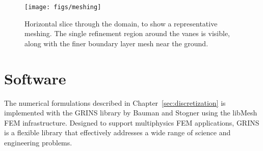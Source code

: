   \begin{figure}[!htb]
    \begin{center}
     \texttt{[image: figs/meshing]}
     \caption{Horizontal slice through the domain, to show a
     representative meshing. The single refinement region around the
     vanes is visible, along with the finer boundary layer mesh near the
     ground.}
     \label{fig:meshing}
    \end{center}
  \end{figure}


%



\section{Software}

The numerical formulations described in Chapter~\ref{sec:discretization}
is implemented with the GRINS library\cite{GRINSpaper} by Bauman
and Stogner using the libMesh\cite{libMeshPaper} FEM
infrastructure. Designed to support multiphysics FEM applications, 
GRINS is a flexible library that effectively addresses a wide range of 
science and engineering problems.   
 

